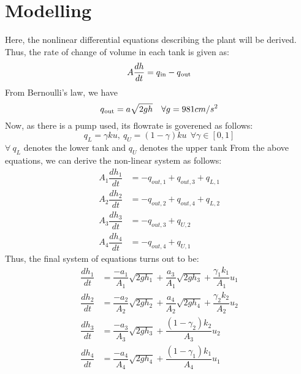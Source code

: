 \documentclass[10pt,a4paper, twocolumn]{article}
\begin{document}
\section{Modelling}
Here, the nonlinear differential equations describing the plant will be derived. Thus, the rate of change of volume in each tank is given as:
\begin{equation*}
A\dfrac{dh}{dt} = q\textsubscript{in} - q\textsubscript{out}
\end{equation*}
From Bernoulli's law, we have
\begin{equation*}
q\textsubscript{out} = a\sqrt{2gh} \ \ \  \forall g = 981 cm/s^2
\end{equation*}
Now, as there is a pump used, its flowrate is goverened as follows:
\begin{equation*}
q_L = \gamma ku, \ q_U = (1-\gamma) ku \ \ \forall \gamma \in [0,1]
\end{equation*}
$\forall \ q_L$ denotes the lower tank and $q_U$ denotes the upper tank
From the above equations, we can derive the non-linear system as follows:
\begin{align*}
A_1\dfrac{dh_1}{dt} &= -q_{out,1} + q_{out,3} + q_{L,1} \\
A_2\dfrac{dh_2}{dt} &= -q_{out,2} + q_{out,4} + q_{L,2} \\
A_3\dfrac{dh_3}{dt} &= -q_{out,3} + q_{U,2} \\
A_4\dfrac{dh_4}{dt} &= -q_{out,4} + q_{U,1}
\end{align*}
Thus, the final system of equations turns out to be:
\begin{equation}
\begin{aligned}
\dfrac{dh_1}{dt} &= \dfrac{-a_1}{A_1}\sqrt{2gh_1} + \dfrac{a_3}{A_1} \sqrt{2gh_3} + \dfrac{\gamma _1 k_1}{A_1}u_1\\
\dfrac{dh_2}{dt} &= \dfrac{-a_2}{A_2}\sqrt{2gh_2} + \dfrac{a_4}{A_2} \sqrt{2gh_4} + \dfrac{\gamma _2 k_2}{A_2}u_2\\
\dfrac{dh_3}{dt} &= \dfrac{-a_3}{A_3}\sqrt{2gh_3} + \dfrac{(1- \gamma _2) k_2}{A_3}u_2\\
\dfrac{dh_4}{dt} &= \dfrac{-a_4}{A_4}\sqrt{2gh_4} + \dfrac{(1- \gamma _1) k_1}{A_4}u_1
\end{aligned}
\label{eqn:nonlinear}
\end{equation}
\end{document}
